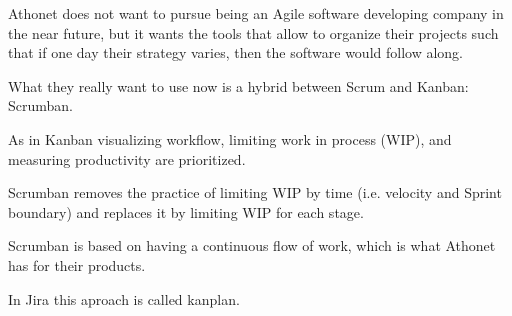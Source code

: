 	Athonet does not want to pursue being an Agile software developing company in the near future, but it wants the tools that allow to organize their projects such that if one day their strategy varies, then the software would follow along.

	What they really want to use now is a hybrid between Scrum and Kanban: Scrumban.
	
	As in Kanban visualizing workflow, limiting work in process (WIP), and measuring productivity are prioritized.
	
	Scrumban removes the practice of limiting WIP by time (i.e. velocity and Sprint boundary) and replaces it by limiting WIP for each stage.
	
	Scrumban is based on having a continuous flow of work, which is what Athonet has for their products.
	
	In Jira this aproach is called kanplan.
	
